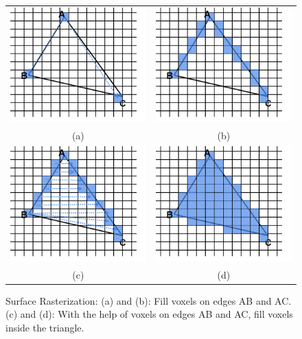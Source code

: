 \begin{figure}
\begin{center}
\begin{tabular}{cc}   %
   \includegraphics[width=0.45\linewidth]{rasterization_fill2vertices} & 
   \includegraphics[width=0.45\linewidth]{rasterization_filledges}  \\
   (a) & (b)\\
   \includegraphics[width=0.45\linewidth]{rasterization_fillsurface} &
   \includegraphics[width=0.45\linewidth]{rasterization_fullfilled}  \\
   (c) & (d)\\
\end{tabular}
\caption{Surface Rasterization: (a) and (b): Fill voxels on edges AB and AC. (c) and (d): With the help of voxels on edges AB and AC, fill voxels inside the triangle.} 
  \label{rasterization}
\end{center}
\end{figure}


